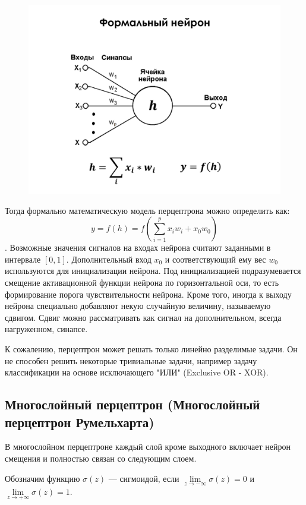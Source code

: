 \documentclass[11pt, oneside]{article}   	%
\begin{document}
	\begin{figure}[h]
		\centering
		\includegraphics[width=0.7\linewidth]{imgs/math_neuron}
	\end{figure}
	
	Тогда формально математическую модель перцептрона можно определить как:
	$$ y = f(h) = f(\sum\limits_{i=1}^{p} x_i w_i + x_0w_0) $$.
	Возможные значения сигналов на входах нейрона считают заданными в интервале $ [0,1] $.
	Дополнительный вход $ x_{0} $ и соответствующий ему вес $ w_{0} $ используются для инициализации нейрона. Под инициализацией подразумевается смещение активационной функции нейрона по горизонтальной оси, то есть формирование порога чувствительности нейрона. Кроме того, иногда к выходу нейрона специально добавляют некую случайную величину, называемую сдвигом. Сдвиг можно рассматривать как сигнал на дополнительном, всегда нагруженном, синапсе.

	К сожалению, перцептрон может решать только линейно разделимые задачи. Он не способен решить некоторые тривиальные задачи, например задачу классификации на основе исключающего "ИЛИ" (Exclusive OR - XOR). 
	
	\subsection{Многослойный перцептрон (Многослойный перцептрон Румельхарта)}
	
	В многослойном перцептроне каждый слой кроме выходного включает нейрон смещения и полностью связан со следующим слоем.\\
	
	\begin{figure}[h]
	\end{figure}
	Обозначим функцию $\sigma(z)$ --- сигмоидой, если $\lim\limits_{z 	\rightarrow -\infty}\sigma(z) = 0$ и $\lim\limits_{z 	\rightarrow +\infty}\sigma(z) = 1$.
	
\end{document}
